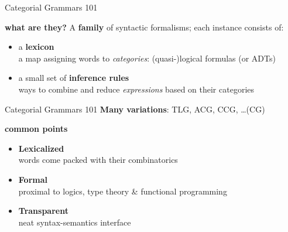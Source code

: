 \documentclass{beamer}
\begin{document}
\begin{frame}{Categorial Grammars 101}
    \smaller
    \begin{block}{\textbf{\smaller what are they?}}
    A \textbf{family} of syntactic formalisms; each instance consists of:
        \begin{itemize}
            \item a \textbf{lexicon}\\
            a map assigning words to \textit{categories}:
            (quasi-)logical formulas (or ADTs)
            \item a small set of \textbf{inference rules}\\
            ways to combine and reduce \textit{expressions} based on their categories 
        \end{itemize}
    \end{block}
\end{frame}

\begin{frame}{Categorial Grammars 101}
    \smaller
    \textbf{Many variations}: TLG, ACG, CCG, \dots ({\text{*}}CG)\\
    \hfill
    
    {
        \begin{block}{\smaller \textbf{common points}}
            \begin{itemize}
                \item \textbf{Lexicalized}\\
                words come packed with their combinatorics 
                \item \textbf{Formal}\\
                proximal to logics, type theory \& functional programming
                \item \textbf{Transparent}\\
                neat syntax-semantics interface
            \end{itemize}
        \end{block}
    }
\end{frame}
\end{document}
